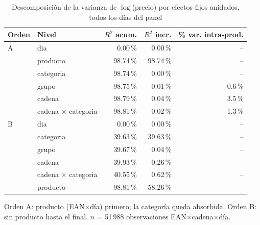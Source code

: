 \begin{table}[htbp]
\caption{Descomposici\'on de la varianza de $\log$(precio) por efectos fijos anidados, todos los d\'ias del panel}
\label{tab:varianza}
\centering\scriptsize\setlength{\tabcolsep}{3pt}
\begin{tabular}{@{}llrrr@{}}
\toprule
Orden & Nivel & $R^2$ acum. & $R^2$ incr. & \% var. intra-prod. \\
\midrule
A & dia & 0.00\,\% & 0.00\,\% & -- \\
 & producto & 98.74\,\% & 98.74\,\% & -- \\
 & categoria & 98.74\,\% & 0.00\,\% & -- \\
 & grupo & 98.75\,\% & 0.01\,\% & 0.6\,\% \\
 & cadena & 98.79\,\% & 0.04\,\% & 3.5\,\% \\
 & cadena $\times$ categoria & 98.81\,\% & 0.02\,\% & 1.3\,\% \\
\midrule
B & dia & 0.00\,\% & 0.00\,\% & -- \\
 & categoria & 39.63\,\% & 39.63\,\% & -- \\
 & grupo & 39.67\,\% & 0.04\,\% & -- \\
 & cadena & 39.93\,\% & 0.26\,\% & -- \\
 & cadena $\times$ categoria & 40.55\,\% & 0.62\,\% & -- \\
 & producto & 98.81\,\% & 58.26\,\% & -- \\
\bottomrule\end{tabular}
\par\smallskip\raggedright\scriptsize Orden A: producto (EAN$\times$d\'ia) primero; la categor\'ia queda absorbida. Orden B: sin producto hasta el final. $n$ = 51\,988 observaciones EAN$\times$cadena$\times$d\'ia.
\end{table}
